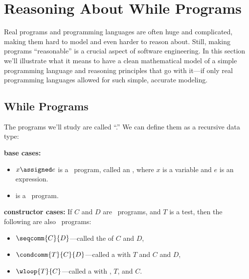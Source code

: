 \section{Reasoning About \textbf{While} Programs}\label{while_chap}

Real programs and programming languages are often huge and complicated,
making them hard to model and even harder to reason about.  Still, making
programs ``reasonable'' is a crucial aspect of software engineering.  In
this section we'll illustrate what it means to have a clean mathematical
model of a simple programming language and reasoning principles that go
with it---if only real programming languages allowed for such simple,
accurate modeling.

\subsection{\textbf{While} Programs}

The programs we'll study are called ``.''  We
can define them as a recursive data type:
\begin{definition}\label{whiledef} \mbox{}

\textbf{base cases:}
\begin{itemize}

\item $x \assigned e$ is a \while\ program, called an , where $x$ is a variable and $e$ is an expression.

\item \term{$\halt$} is a \while\ program.

\end{itemize}

\textbf{constructor cases:}
If $C$ and $D$ are \while\ programs, and $T$ is a test, then the following are also
\while\ programs:
\begin{itemize}

\item $\seqcomm{C}{D}$---called the  of $C$ and $D$,

\item $\condcomm{T}{C}{D}$---called a  with
   $T$ and  $C$ and $D$,

\item $\wloop{T}{C}$---called a  with ,
  $T$, and  $C$.

\end{itemize}
\end{definition}


